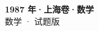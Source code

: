\documentclass[zihao=-4, a4paper]{ctexart}
\begin{document}
\begin{center}
  {\Large\bfseries 1987 年·上海卷·数学}\\[4pt]
  {\large 数学 · 试题版}
\end{center}
\medskip
{}

\end{document}
